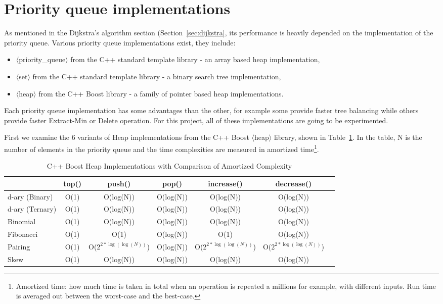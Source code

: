 \section{Priority queue implementations} \label{sec:pq_implementation}
As mentioned in the Dijkstra's algorithm section (Section~\ref{sec:dijkstra},
its performance is heavily depended on the implementation of the priority queue.
Various priority queue implementations exist,
they include:
\begin{itemize}
    \item $\langle$priority\_queue$\rangle$ from the C++ standard template library - an array based heap implementation,
    \item $\langle$set$\rangle$ from the C++ standard template library - a binary search tree implementation,
    \item $\langle$heap$\rangle$ from the C++ Boost library - a family of pointer based heap implementations.
\end{itemize}
Each priority queue implementation has some advantages than the other,
for example some provide faster tree balancing while others provide faster Extract-Min or Delete operation.
For this project, all of these implementations are going to be experimented.

First we examine the 6 variants of Heap implementations from the C++ Boost $\langle$heap$\rangle$ library, shown in Table~\ref{table:heaps}.
In the table, N is the number of elements in the priority queue and
the time complexities are measured in amortized time\footnote{
Amortized time: how much time is taken in total when an operation is repeated a millions for example, with different inputs. Run time is averaged out between the worst-case and the best-case.}.

\begin{table}[H]
    \centering
    \begin{tabular*}{\textwidth}{@{\extracolsep{\fill}} l|cccccc}
        & top() & push()    & pop()     & increase() & decrease() \\ \midrule
        d-ary (Binary)  & O(1)  & O(log(N)) & O(log(N)) & O(log(N))  & O(log(N))  \\
        d-ary (Ternary) & O(1)  & O(log(N)) & O(log(N)) & O(log(N))  & O(log(N))  \\
        Binomial        & O(1)  & O(log(N)) & O(log(N)) & O(log(N))  & O(log(N))  \\
        Fibonacci       & O(1)  & O(1)      & O(log(N)) & O(1)       & O(log(N))  \\
        Pairing         & O(1)  & O($2^{2*\log(\log(N))}$) & O(log(N)) & O($2^{2*\log(\log(N))}$) & O($2^{2*\log(\log(N))}$) \\
        Skew            & O(1)  & O(log(N)) & O(log(N)) & O(log(N)) & O(log(N))   
    \end{tabular*}
    \caption{C++ Boost Heap Implementations with Comparison of Amortized Complexity \citep{BoostHeap}}
    \label{table:heaps}
\end{table}


